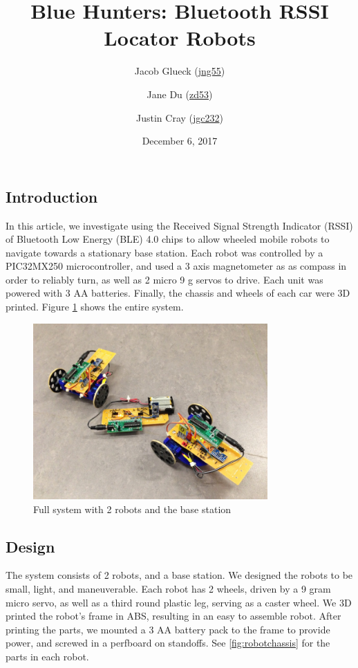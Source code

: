 \documentclass[]{article}
\title{Blue Hunters: Bluetooth RSSI Locator Robots}
\author{Jacob Glueck (\href{mailto:jng55@cornell.edu}{jng55}) \and Jane Du (\href{mailto:zd53@cornell.edu}{zd53}) \and Justin Cray (\href{mailto:jgc232@cornell.edu}{jgc232})}
\date{December 6, 2017}
\begin{document}
\maketitle

\hypertarget{introduction}{%
\subsection{Introduction}\label{introduction}}


In this article, we investigate using the Received Signal Strength Indicator (RSSI) of Bluetooth Low Energy (BLE) 4.0 chips to allow wheeled mobile robots to navigate towards a stationary base station.
Each robot was controlled by a PIC32MX250 microcontroller, and used a 3 axis magnetometer as as compass in order to reliably turn, as well as 2 micro 9 g servos to drive.
Each unit was powered with 3 AA batteries.
Finally, the chassis and wheels of each car were 3D printed.
Figure \ref{fig:robotsystem} shows the entire system.

\begin{figure}
  \centering
  \includegraphics[width=0.8\textwidth]{full_system.jpg}
  \caption{Full system with 2 robots and the base station}
  \label{fig:robotsystem}
\end{figure}

\subsection{Design}

The system consists of 2 robots, and a base station.
We designed the robots to be small, light, and maneuverable.
Each robot has 2 wheels, driven by a 9 gram micro servo, as well as a third round plastic leg, serving as a caster wheel.
We 3D printed the robot's frame in ABS, resulting in an easy to assemble robot.
After printing the parts, we mounted a 3 AA battery pack to the frame to provide power,
and screwed in a perfboard on standoffs. See \ref{fig:robotchassis} for the parts in each robot.
\end{document}
